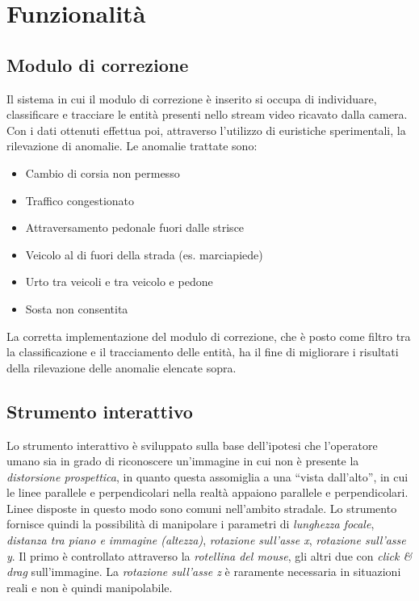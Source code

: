 \chapter{Funzionalità}
\label{sec:funzionalita}

\section{Modulo di correzione}
Il sistema in cui il modulo di correzione è inserito si occupa di individuare, classificare e tracciare le entità presenti nello stream video ricavato dalla camera.
Con i dati ottenuti effettua poi, attraverso l'utilizzo di euristiche sperimentali, la rilevazione di anomalie.
Le anomalie trattate sono:
\begin{itemize}
    \item Cambio di corsia non permesso
    \item Traffico congestionato
    \item Attraversamento pedonale fuori dalle strisce 
    \item Veicolo al di fuori della strada (es. marciapiede) %
    \item Urto tra veicoli e tra veicolo e pedone
    \item Sosta non consentita
\end{itemize}
La corretta implementazione del modulo di correzione, che è posto come filtro tra la classificazione e il tracciamento delle entità, ha il fine di migliorare i risultati della rilevazione delle anomalie elencate sopra.

\section{Strumento interattivo}
Lo strumento interattivo è sviluppato sulla base dell'ipotesi che l'operatore umano sia in grado di riconoscere un'immagine in cui non è presente la \emph{distorsione prospettica}, in quanto questa assomiglia a una ``vista dall'alto'', in cui le linee parallele e perpendicolari nella realtà appaiono parallele e perpendicolari. 
Linee disposte in questo modo sono comuni nell'ambito stradale.
Lo strumento fornisce quindi la possibilità di manipolare i parametri di \emph{lunghezza focale}, \emph{distanza tra piano e immagine (altezza)}, \emph{rotazione sull'asse x}, \emph{rotazione sull'asse y}.
Il primo è controllato attraverso la \emph{rotellina del mouse}, gli altri due con \emph{click \& drag} sull'immagine.
La \emph{rotazione sull'asse z} è raramente necessaria in situazioni reali e non è quindi manipolabile.

